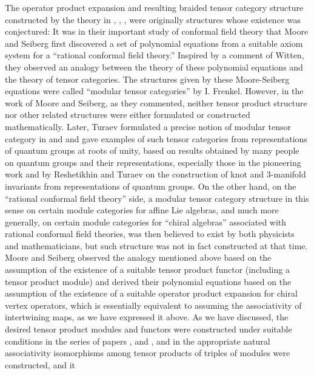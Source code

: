 \documentclass[12pt]{article}
\begin{document}
\begin{rema}\label{hist-btc}{\rm
The operator product expansion and resulting braided tensor category
structure constructed by the theory in \cite{tensor1}, \cite{tensor2},
\cite{tensor3}, \cite{tensor4} were originally structures whose
existence was conjectured: It was in their important study of
conformal field theory that Moore and Seiberg \cite{MS1} \cite{MS}
first discovered a set of polynomial equations from a suitable axiom
system for a ``rational conformal field theory.'' Inspired by a
comment of Witten, they observed an analogy between the theory of
these polynomial equations and the theory of tensor categories. The
structures given by these Moore-Seiberg equations were called
``modular tensor categories'' by I. Frenkel.  However, in the work of
Moore and Seiberg, as they commented, neither tensor product structure
nor other related structures were either formulated or constructed
mathematically. Later, Turaev formulated a precise notion of modular
tensor category in \cite{T1} and \cite{T} and gave examples of such
tensor categories from representations of quantum groups at roots of
unity, based on results obtained by many people on quantum groups and
their representations, especially those in the pioneering work
\cite{RT1} and \cite{RT2} by Reshetikhin and Turaev on the
construction of knot and $3$-manifold invariants from representations
of quantum groups. On the other hand, on the ``rational conformal
field theory'' side, a modular tensor category structure in this sense
on certain module categories for affine Lie algebras, and much more
generally, on certain module categories for ``chiral algebras''
associated with rational conformal field theories, was then believed
to exist by both physicists and mathematicians, but such structure was
not in fact constructed at that time.  Moore and Seiberg observed the
analogy mentioned above based on the assumption of the existence of a
suitable tensor product functor (including a tensor product module)
and derived their polynomial equations based on the assumption of the
existence of a suitable operator product expansion for chiral vertex
operators, which is essentially equivalent to assuming the
associativity of intertwining maps, as we have expressed it above.  As
we have discussed, the desired tensor product modules and functors
were constructed under suitable conditions in the series of papers
\cite{tensor1}, \cite{tensor2} and \cite{tensor3}, and in
\cite{tensor4} the appropriate natural associativity isomorphisms
among tensor products of triples of modules were constructed, and it
}
\end{rema}
\end{document}
